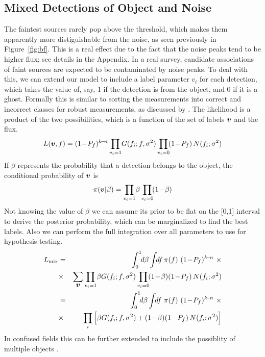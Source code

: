 \documentclass[twocolumn]{emulateapj}
\newcommand{\apjvec}[1]{\mbox{\boldmath{$#1$}}}
\begin{document}
\subsection{Mixed Detections of Object and Noise}
\label{sec:mix}
\noindent
The faintest sources rarely pop above the threshold, which makes them apparently more distiguishable from the noise, as seen previously in Figure~\ref{fig:bf}. This is a real effect due to the fact that the noise peaks tend to be higher flux; see details in the Appendix. In a real survey, candidate associations of faint sources are expected to be contaminated  by noise peaks. To deal with this, we can  extend our model to include a label parameter $v_i$ for each detection, which takes the value of, say, 1 if the detection is from the object, and 0 if it is a ghost.
%
Formally this is similar to sorting the measurements into correct and incorrect classes for robust measurements, as discussed by \citet{press}.
%
The likelihood is a product of the two possibilities, which is a function of the set of labels $\apjvec{v}$ and the flux.
%
\begin{equation}
L(\apjvec{v},f)= (1\!-\!P_f)^{k\!-\!n} \prod_{v_i=1}\!G(f_i;f,\sigma^2) \prod_{v_i=0}\!(1\!-\!P_f)\,N(f_i;\sigma^2)
\end{equation}
%
If $\beta$ represents the probability that a detection belongs to the object, the conditional probability of $\apjvec{v}$ is
%
\begin{equation}
\pi(\apjvec{v}|\beta) = \prod_{v_i=1}\!\beta \prod_{v_i=0}\!(1\!-\!\beta)
\end{equation}
%
Not knowing the value of $\beta$ we can assume its prior to be flat on the [0,1] interval to derive the posterior probability, which can be marginalized to find the best labels. Also we can perform the full integration over all parameters to use for hypothesis testing.
%
\begin{eqnarray}
L_{\text{mix}} & = & \int_0^1\!\!d\beta \int\!\!df\,\pi(f)\ (1\!-\!P_f)^{k\!-\!n} \ \times\\
 & \times & \sum_{\apjvec{v}}\prod_{v_i=1}\!\beta G(f_i;f,\sigma^2) \prod_{v_i=0}\!(1\!-\!\beta)(1\!-\!P_f)\,N(f_i;\sigma^2) \nonumber \\
 & = & \int_0^1\!\!d\beta \int\!\!df\ \pi(f)\ (1\!-\!P_f)^{k\!-\!n}  \ \times \\
 & \times & \prod_i \Big[\beta G(f_i;f,\sigma^2) + (1\!-\!\beta)(1\!-\!P_f)\,N(f_i;\sigma^2) \Big] \nonumber
\end{eqnarray}
%
In confused fields this can be further extended to include the possiblity of multiple objects \citep{loredo}.
\end{document}
